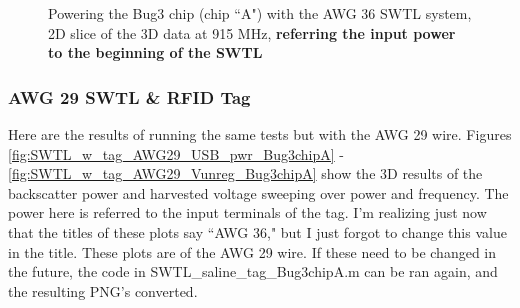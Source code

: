 \documentclass[12pt,onecolumn,titlepage]{article}
\begin{document}
\begin{figure}[htbp]
	\centering
		\quad
	\label{fig:SWTL_w_tag_AWG36_2D_SWTLref}
	\caption{Powering the Bug3 chip (chip ``A") with the AWG 36 SWTL system, 2D slice of the 3D data at 915 MHz, {\bf{referring the input power to the beginning of the SWTL}} }
\end{figure}



\subsubsection{AWG 29 SWTL \& RFID Tag}
\indent \indent Here are the results of running the same tests but with the AWG 29 wire. Figures \ref{fig:SWTL_w_tag_AWG29_USB_pwr_Bug3chipA} - \ref{fig:SWTL_w_tag_AWG29_Vunreg_Bug3chipA} show the 3D results of the backscatter power and harvested voltage sweeping over power and frequency. The power here is referred to the input terminals of the tag. I'm realizing just now that the titles of these plots say ``AWG 36," but I just forgot to change this value in the title. These plots are of the AWG 29 wire. If these need to be changed in the future, the code in SWTL\_saline\_tag\_Bug3chipA.m can be ran again, and the resulting PNG's converted.
\end{document}
